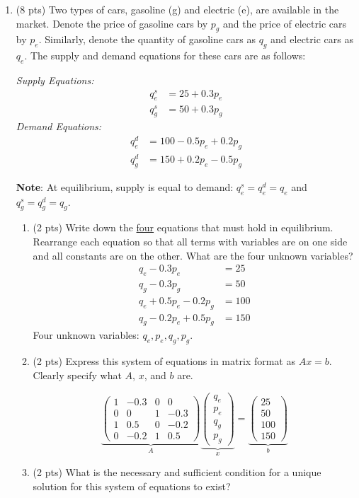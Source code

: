 \documentclass{./../../../Latex/tests}
\begin{document}
\begin{enumerate}
\newpage
\item (8 pts) Two types of cars, gasoline (g) and electric (e), are available in the market. Denote the price of gasoline cars by \(p_g\) and the price of electric cars by \(p_e\). Similarly, denote the quantity of gasoline cars as \(q_g\) and electric cars as \(q_e\). The supply and demand equations for these cars are as follows:

\textit{Supply Equations:}
\begin{align*}
q^s_e &= 25 + 0.3p_e \\
q^s_g &= 50 + 0.3p_g
\end{align*}
\textit{Demand Equations:}
\begin{align*}
q^d_e &= 100 - 0.5p_e + 0.2p_g \\
q^d_g &= 150 + 0.2p_e - 0.5p_g
\end{align*}

\textbf{Note}: At equilibrium, supply is equal to demand: \(q^s_e = q^d_e = q_e\) and \(q^s_g = q^d_g = q_g\).

\begin{enumerate}
\item (2 pts) Write down the \underline{four} equations that must hold in equilibrium. Rearrange each equation so that all terms with variables are on one side and all constants are on the other. What are the four unknown variables?
\begin{align}
q_e-0.3p_e &= 25  \\
q_g - 0.3p_g &= 50  \\
q_e + 0.5p_e - 0.2p_g &= 100  \\
q_g - 0.2p_e + 0.5p_g &= 150 
\end{align}
Four unknown variables: $q_e, p_e, q_g, p_g$. \\
\item (2 pts) Express this system of equations in matrix format as \(Ax = b\). Clearly specify what \(A\), \(x\), and \(b\) are.

\[
\underbrace{\begin{pmatrix}
1 & -0.3 & 0 & 0 \\
0 & 0 & 1 & -0.3 \\
1 & 0.5 & 0 & -0.2 \\
0 & -0.2 & 1 & 0.5
\end{pmatrix}}_{A} 
\underbrace{\begin{pmatrix}
q_e \\
p_e \\
q_g \\
p_g
\end{pmatrix}}_{x}
=
\underbrace{\begin{pmatrix}
25 \\
50 \\
100 \\
150
\end{pmatrix}}_{b}
\]
\item (2 pts) What is the necessary and sufficient condition for a unique solution for this system of equations to exist? 


\end{enumerate}
\end{enumerate}
\end{document}
